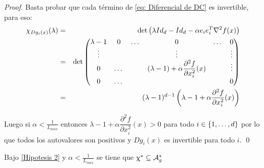 \begin{proof}
	Basta probar que cada t\'ermino de \ref{eq: Diferencial de DC} es invertible, para eso:
	\begin{equation*}
	\begin{aligned}
	\chi_{Dg_i(x)}(\lambda) & = & \det\left(
			\lambda Id_d - Id_d - \alpha e_ie_i^{T} \nabla ^2 f(x)
		\right) \\
		& = & \det\left(
				\begin{matrix}
					\lambda -1 & 0 & \dots & 0 & \dots & 0 \\
					\vdots & & & \vdots & & \vdots \\
					0 & \dots & & (\lambda - 1) + \alpha\dfrac{\partial^2 f}{\partial x_i^2}(x) & & \vdots \\
					0 & \dots & & & & 0 
				\end{matrix}
			\right) \\
			& = & (\lambda -1)^{d-1}\left(\lambda -1 + \alpha\dfrac{\partial^2 f}{\partial x_i^2}(x) \right)
	\end{aligned}
	\end{equation*}
	
	Luego si $\alpha < \frac{1}{L_{max}}$ entonces $\lambda -1 + \alpha\dfrac{\partial^2 f}{\partial x_i^2}(x) > 0$ para todo $i \in \left\lbrace1, \dots, d\right\rbrace$ por lo que todos los autovalores son positivos y $Dg_i(x)$ es invertible para todo $i$. \qed
	
\end{proof}

\begin{proposition}
	\label{prop: DC los puntos silla estrictos son fijos inestables}
	Bajo \ref{Hipotesis 2} y $\alpha < \frac{1}{L_{max}}$ se tiene que $\upchi^* \subseteq \mathcal{A}_{g}^{*}$
\end{proposition}

